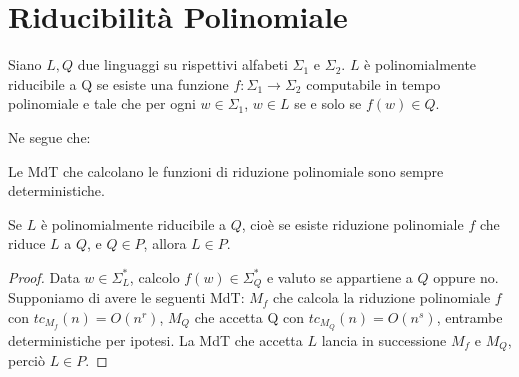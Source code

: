 \section{Riducibilità Polinomiale}

\begin{defn}
	Siano $L, Q$ due linguaggi su rispettivi alfabeti $\Sigma_1$ e $\Sigma_2$. $L$ è polinomialmente riducibile a Q se esiste una funzione $f : \Sigma_1 \rightarrow \Sigma_2$ computabile in tempo polinomiale e tale che per ogni $w \in \Sigma_1$, $w \in L$ se e solo se $f(w) \in Q$.
\end{defn}

Ne segue che: \\

\begin{remark}
	Le MdT che calcolano le funzioni di riduzione polinomiale sono sempre deterministiche.
\end{remark}

\vspace{0.2cm}

\begin{defn}
	Se $L$ è polinomialmente riducibile a $Q$, cioè se esiste riduzione polinomiale $f$ che riduce $L$ a $Q$, e $Q \in P$, allora $L \in P$.
\end{defn}

\begin{proof}
	Data $w \in \Sigma_L^\ast$, calcolo $f(w) \in \Sigma_Q^\ast$ e valuto se appartiene a $Q$ oppure no. Supponiamo di avere le seguenti MdT: $M_f$ che calcola la riduzione polinomiale $f$ con $tc_{M_f}(n) = O(n^r)$, $M_Q$ che accetta Q con $tc_{M_Q}(n) = O(n^s)$, entrambe deterministiche per ipotesi. La MdT che accetta $L$ lancia in successione $M_f$ e $M_Q$, perciò $L \in P$.
\end{proof}

